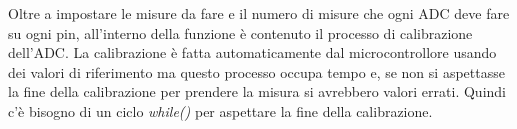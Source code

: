 Oltre a impostare le misure da fare e il numero di misure che ogni ADC deve fare su ogni pin, all'interno della funzione è contenuto il processo di calibrazione dell'ADC. La calibrazione è fatta automaticamente dal microcontrollore usando dei valori di riferimento ma questo processo occupa tempo e, se non si aspettasse la fine della calibrazione per prendere la misura si avrebbero valori errati. Quindi c'è bisogno di un ciclo \textit{while()} per aspettare la fine della calibrazione.\\
